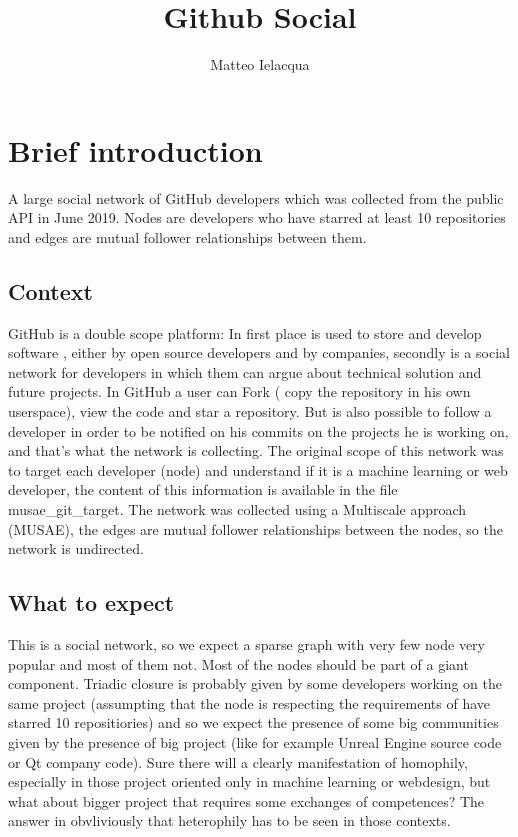\documentclass[]{article}
\begin{document}
\author{Matteo Ielacqua}
\title{Github Social}
\maketitle
    \section{Brief introduction}
    A large social network of GitHub developers which was collected from the public API in June 2019. Nodes are developers who have starred at least 10 repositories and edges are mutual follower relationships between them.
    \subsection{Context}
    GitHub is a double scope platform: In first place is used to store and develop software , either by open source developers and by companies, secondly is a social network for developers in which them can argue about technical solution and future projects. In GitHub a user can Fork ( copy the repository in his own userspace), view the code and star a repository. But is also possible to follow a developer in order to be notified on his commits on the projects he is working on, and that's what the network is collecting. The original scope of this network was to target each developer (node) and understand if it is a machine learning or web developer, the content of this information is available in the file musae\_git\_target. The network was collected using a Multiscale approach (MUSAE), the edges are mutual follower relationships between the nodes, so the network is undirected.
    
    \subsection{What to expect}
    This is a social network, so we expect a sparse graph with very few node very popular and most of them not. Most of the nodes should be part of a giant component. Triadic closure is probably given by some developers working on the same project (assumpting that the node is respecting the requirements of have starred 10 repositiories) and so we expect the presence of some big communities given by the presence of big project (like for example Unreal Engine source code or Qt company code). Sure there will a clearly manifestation of homophily, especially in those project oriented only in machine learning or webdesign, but what about bigger project that requires some exchanges of competences? The answer in obvliviously that heterophily has to be seen in those contexts. 
\end{document}
